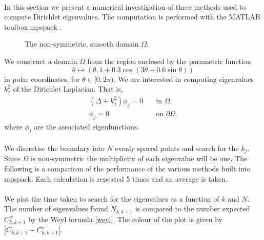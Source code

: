 \documentclass{article}
\begin{document}
\paragraph{}
In this section we present a numerical investigation of three methods used to compute Dirichlet eigenvalues.
The computation is performed with the MATLAB toolbox mpspack \cite{MPS}.
\begin{figure}[htbp]
\centering
{}
\caption{The non-symmetric, smooth domain $\Omega$.}
\end{figure}
We construct a domain $\Omega$ from the region enclosed by the parametric function
\[
\theta \mapsto (\theta, 1 + 0.3 \cos( 3 \theta + 0.6 \sin \theta))
\]
in polar coordinates, for $\theta \in [0, 2\pi)$.
We are interested in computing eigenvalues $k^2_j$ of the Dirichlet Laplacian. That is, \\
\begin{align*}
(\Delta + k_j^2) \phi_j = 0 & \quad \mbox{in } \Omega, \\
\phi_j  = 0 & \quad \mbox{on } \partial \Omega.
\end{align*}
where $\phi_j$ are the associated eigenfunctions.
\paragraph{}
We discretise the boundary into $N$ evenly spaced points and search for the $k_j$.
Since $\Omega$ is non-symmetric the multiplicity of each eigenvalue will be one.
The following is a comparison of the performance of the various methods built into mpspack.
Each calculation is repeated 5 times and an average is taken.
\paragraph{}
We plot the time taken to search for the eigenvalues as a function of $k$ and $N$.
The number of eigenvalues found $N_{k,k+1}$ is compared to the number expected $C^w_{k,k+1}$ by the Weyl formula \ref{weyl}.
The colour of the plot is given by $|C_{k,k+1} - C^w_{k,k+1}|$.
\end{document}
